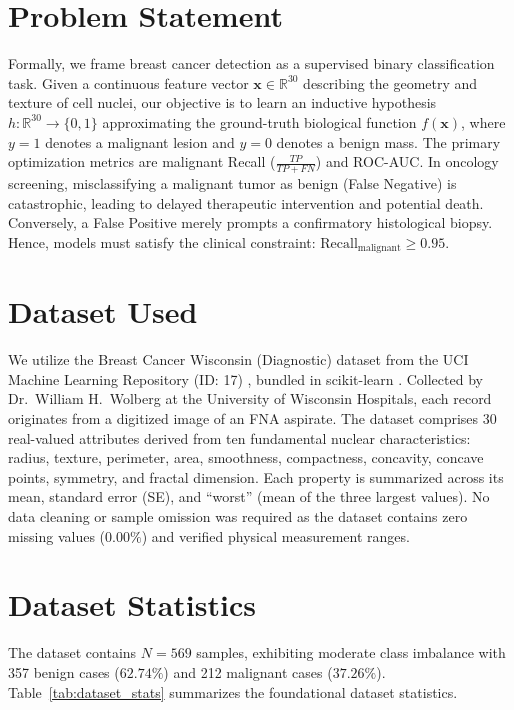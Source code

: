 \documentclass[10pt,journal,compsoc,twocolumn]{IEEEtran}
\begin{document}
\section{Problem Statement}
Formally, we frame breast cancer detection as a supervised binary classification task. Given a continuous feature vector $\mathbf{x} \in \mathbb{R}^{30}$ describing the geometry and texture of cell nuclei, our objective is to learn an inductive hypothesis $h: \mathbb{R}^{30} \to \{0, 1\}$ approximating the ground-truth biological function $f(\mathbf{x})$, where $y=1$ denotes a malignant lesion and $y=0$ denotes a benign mass. The primary optimization metrics are malignant Recall ($\frac{TP}{TP+FN}$) and ROC-AUC. In oncology screening, misclassifying a malignant tumor as benign (False Negative) is catastrophic, leading to delayed therapeutic intervention and potential death. Conversely, a False Positive merely prompts a confirmatory histological biopsy. Hence, models must satisfy the clinical constraint: $\text{Recall}_{\text{malignant}} \ge 0.95$.

\section{Dataset Used}
We utilize the Breast Cancer Wisconsin (Diagnostic) dataset from the UCI Machine Learning Repository (ID: 17) \cite{street1993nuclear}, bundled in scikit-learn \cite{pedregosa2011scikit}. Collected by Dr.~William H.~Wolberg at the University of Wisconsin Hospitals, each record originates from a digitized image of an FNA aspirate. The dataset comprises 30 real-valued attributes derived from ten fundamental nuclear characteristics: radius, texture, perimeter, area, smoothness, compactness, concavity, concave points, symmetry, and fractal dimension. Each property is summarized across its mean, standard error (SE), and ``worst'' (mean of the three largest values). No data cleaning or sample omission was required as the dataset contains zero missing values ($0.00\%$) and verified physical measurement ranges.

\section{Dataset Statistics}
The dataset contains $N=569$ samples, exhibiting moderate class imbalance with 357 benign cases ($62.74\%$) and 212 malignant cases ($37.26\%$). Table~\ref{tab:dataset_stats} summarizes the foundational dataset statistics.
\end{document}

